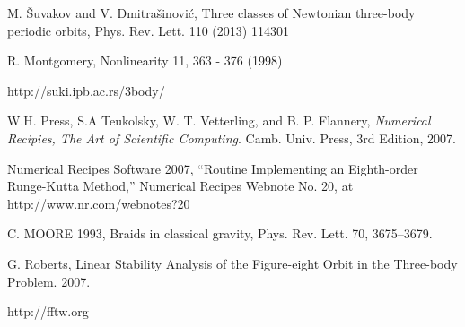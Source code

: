 \documentclass[12pt]{article}
\begin{document}
\begin{thebibliography}{9}

    M. Šuvakov and V. Dmitrašinović, Three classes of Newtonian three-body periodic orbits, Phys. Rev. Lett. 110 (2013) 114301

    R. Montgomery, Nonlinearity 11, 363 - 376 (1998)

    http://suki.ipb.ac.rs/3body/

  W.H. Press, S.A Teukolsky, W. T. Vetterling, and B. P. Flannery,
  \emph{Numerical Recipies, The Art of Scientific Computing}.
  Camb. Univ. Press,
  3rd Edition,
  2007.

    Numerical Recipes Software 2007, “Routine Implementing an Eighth-order Runge-Kutta Method,” Numerical Recipes Webnote No. 20, at http://www.nr.com/webnotes?20

    C. MOORE 1993, Braids in classical gravity, Phys.
    Rev. Lett. 70, 3675–3679.

  G. Roberts, Linear Stability Analysis of the Figure-eight Orbit in the Three-body Problem. 2007.

  http://fftw.org

\end{thebibliography}
\end{document}
